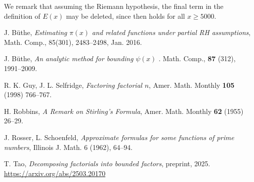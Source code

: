 \documentclass[12pt,a4paper,reqno]{amsart}
\numberwithin{equation}{section}
\theoremstyle{plain}
\theoremstyle{definition}
\begin{document}
We remark that assuming the Riemann hypothesis, the final term in the definition of $E(x)$ may be deleted, since \cite[(7.3)]{buthe} then holds for all $x \geq 5000$.

  
\begin{thebibliography}{10}

J. B\"uthe, \emph{Estimating $\pi(x)$ and related functions under partial RH assumptions}, Math. Comp., 85(301), 2483--2498, Jan. 2016.

J. B\"uthe, \emph{An analytic method for bounding $\psi(x)$
}. Math. Comp., \textbf{87} (312), 1991--2009.



R. K. Guy, J. L. Selfridge, \emph{Factoring factorial $n$}, Amer. Math. Monthly \textbf{105} (1998) 766--767.

H. Robbins, \emph{A Remark on Stirling's Formula}, Amer. Math. Monthly \textbf{62} (1955) 26--29.

J. Rosser, L. Schoenfeld, \emph{Approximate formulas for some functions of prime numbers}, Illinois J. Math. 6 (1962), 64--94.

T. Tao, \emph{Decomposing factorials into bounded factors}, preprint, 2025. \url{https://arxiv.org/abs/2503.20170}

\end{thebibliography}
\end{document}
